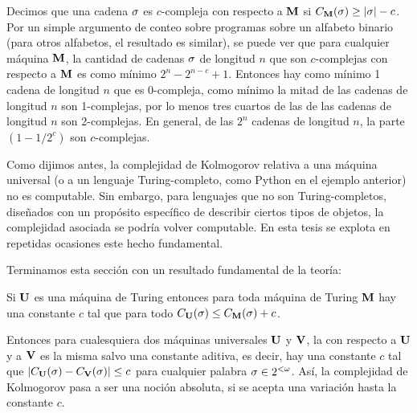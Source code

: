 

Decimos que una cadena $\sigma$ es $c$-compleja con respecto a ${\bf M}$ si $C_{{\bf M}}(\sigma)\geq |\sigma|-c$. Por un simple argumento de conteo sobre programas sobre un alfabeto binario (para otros alfabetos, el resultado es similar), se puede ver que para cualquier máquina ${\bf M}$, la cantidad de cadenas $\sigma$ de longitud $n$ que son $c$-complejas con respecto a ${\bf M}$ es como mínimo $2^n-2^{n-c}+1$. Entonces hay como mínimo 1 cadena de longitud $n$ que es 0-compleja, como mínimo la mitad de las cadenas de longitud $n$ son 1-complejas, por lo menos tres cuartos de las de las cadenas de longitud $n$ son 2-complejas. En general, de las $2^n$ cadenas de longitud $n$, la parte $(1-1/2^c)$ son $c$-complejas.


Como dijimos antes, la complejidad de Kolmogorov relativa a una máquina universal (o a un lenguaje Turing-completo, como Python en el ejemplo anterior) no es computable. Sin embargo, para lenguajes que no son Turing-completos, diseñados con un propósito específico de describir ciertos tipos de objetos, la complejidad asociada se podría volver computable. En esta tesis se explota en repetidas ocasiones este hecho fundamental.

Terminamos esta sección con un resultado fundamental de la teoría:
%
\begin{teorema}[Invariancia]\label{intro:thm:invariance}
 Si ${\bf U}$ es una máquina de Turing \opt entonces para toda máquina de Turing ${\bf M}$ hay una constante $c$ tal que para todo
$C_{{\bf U}}(\sigma)\leq C_{{\bf M}}(\sigma)+c$.
\end{teorema}
%
Entonces para cualesquiera dos máquinas universales ${\bf U}$ y ${\bf V}$, la
\kolcomp con respecto a ${\bf U}$ y a ${\bf V}$ es la misma salvo una constante aditiva, es decir, hay una constante  $c$ tal que 
$\left| C_{{\bf U}}(\sigma)-C_{{\bf V}}(\sigma) \right|\leq c$ para cualquier palabra $\sigma\in2^{<\omega}$. Así, la complejidad de Kolmogorov pasa a ser una noción absoluta, si se acepta una variación hasta la constante $c$. 

